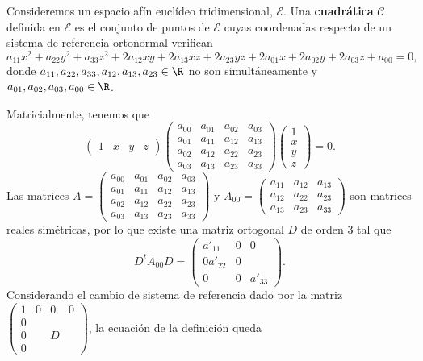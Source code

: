 \begin{fdefinition}[Cuadráticas]
\normalfont Consideremos un espacio afín euclídeo tridimensional, $\displaystyle \mathcal{E} $. Una \textbf{cuadrática} $\displaystyle \mathcal{C} $ definida en $\displaystyle \mathcal{E} $ es el conjunto de puntos de $\displaystyle \mathcal{E} $ cuyas coordenadas respecto de un sistema de referencia ortonormal verifican
\[a_{11}x^{2}+a_{22}y^{2}+a_{33}z^{2}+2a_{12}xy+2a_{13}xz+2a_{23}yz+2a_{01}x+2a_{02}y+2a_{03}z+a_{00} = 0 , \]
donde $\displaystyle a_{11}, a_{22}, a_{33}, a_{12}, a_{13}, a_{23} \in \R $ no son simultáneamente y $\displaystyle a_{01}, a_{02}, a_{03}, a_{00} \in \R $.
\end{fdefinition}
Matricialmente, tenemos que 
\[\begin{pmatrix} 1 & x & y & z \end{pmatrix}\begin{pmatrix} a_{00} & a_{01} & a_{02} & a_{03} \\
a_{01} & a_{11} & a_{12} & a_{13} \\
a_{02} & a_{12} & a_{22} & a_{23} \\ 
a_{03} & a_{13} & a_{23} & a_{33}\end{pmatrix}\begin{pmatrix} 1 \\ x\\ y \\ z \end{pmatrix} = 0 .\]
Las matrices $\displaystyle A = \begin{pmatrix} a_{00} & a_{01} & a_{02} & a_{03} \\
a_{01} & a_{11} & a_{12} & a_{13} \\
a_{02} & a_{12} & a_{22} & a_{23} \\ 
a_{03} & a_{13} & a_{23} & a_{33}\end{pmatrix} $ y $\displaystyle A_{00} = \begin{pmatrix} a_{11} & a_{12} & a_{13} \\
a_{12} & a_{22} & a_{23} \\
a_{13} & a_{23} & a_{33}\end{pmatrix} $ son matrices reales simétricas, por lo que existe una matriz ortogonal $\displaystyle D  $ de orden 3 tal que 
	\[ D^{t}A_{00}D = \begin{pmatrix} a'_{11} & 0 & 0 \\
	0 a'_{22} & 0 \\
0 & 0 & a'_{33}\end{pmatrix}.\]
		Considerando el cambio de sistema de referencia dado por la matriz $\displaystyle \begin{pmatrix} 1 & 0 & 0 & 0 \\
		0 &  & & \\
	0 & & D & \\
0 & & & \end{pmatrix} $, la ecuación de la definición queda
